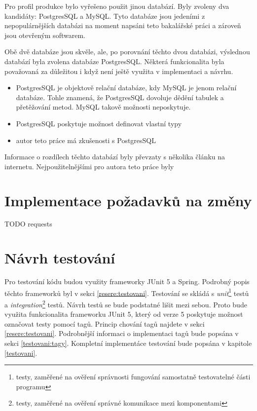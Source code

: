     Pro profil produkce bylo vyřešeno použit jinou databází. Byly zvoleny dva kandidáty: PostgresSQL a MySQL. Tyto databáze jsou jedeními z nepopulárnějších databázi na moment napsáni teto bakalářské práci a zároveň jsou otevřeným softwarem.
    
    Obě dvě databáze jsou skvěle, ale, po porovnání těchto dvou databázi, výslednou databází byla zvolena databáze PostgresSQL. Některá funkcionalita byla považovaná za důležitou i když není ještě využita v implementaci a návrhu.
    \begin{itemize}
            \item PostgresSQL je objektově relační databáze\cite{postgres-about}, kdy MySQL je jenom relační databáze\cite{mysql-wiki}. Tohle znamená, že PostgresSQL dovoluje dědění tabulek a přetěžování metod. MySQL takově možnosti neposkytuje.
            \item PostgresSQL poskytuje možnost definovat vlastní typy\cite{pstgres-create-type}
            \item autor teto práce má zkušenosti s PostgresSQL
    \end{itemize}
    Informace o rozdílech těchto databází byly převzaty s několika článku na internetu. Nejpoužitelnějšími pro autora teto práce byly \cite{mysql-postgres1, mysql-postgres2}
    
\section{Implementace požadavků na změny}\label{impl:requests}
    TODO requests
    
\section{Návrh testování}\label{navrh:testovani}
    Pro testování kódu budou využity frameworky JUnit 5 a Spring. Podrobný popis těchto frameworků byl v sekci \ref{resere:testovani}. Testování se skládá s \textit{unit}\footnote{testy, zaměřené na ověření správnosti fungování samostatně testovatelné části programu} testů a \textit{integration}\footnote{testy, zaměřené na ověření správné komunikace mezi komponentami} testů. Návrh testů se bude podstatné lišit mezi sebou. Proto bude využita funkcionalita frameworku JUnit 5, který od verze 5 poskytuje možnost označovat testy pomocí tagů\cite{junit-tags}. Princip chování tagů najdete v sekci \ref{resere:testovani}. Podrobnější informaci o implementaci tagů bude popsána v sekci \ref{testovani:tagy}. 
    Kompletní implementáce testování bude popsána v kapitole \ref{testovani}.
    
